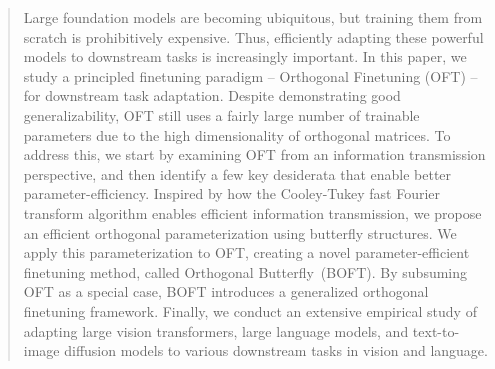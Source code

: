 \begin{abstract}
Large foundation models are becoming ubiquitous, but training them from scratch is prohibitively expensive. Thus, efficiently adapting these powerful models to downstream tasks is increasingly important. In this paper, we study a principled finetuning paradigm -- Orthogonal Finetuning (OFT) -- for downstream task adaptation. Despite demonstrating good generalizability, OFT still uses a fairly large number of trainable parameters due to the high dimensionality of orthogonal matrices. To address this, we start by examining OFT from an information transmission perspective, and then identify a few key desiderata that enable better parameter-efficiency. Inspired by how the Cooley-Tukey fast Fourier transform algorithm enables efficient information transmission, we propose an efficient orthogonal parameterization using  butterfly structures. We apply this parameterization to OFT, creating  a novel parameter-efficient finetuning method, called Orthogonal Butterfly~(BOFT). By subsuming OFT as a special case, BOFT introduces a generalized orthogonal finetuning framework. Finally, we conduct an extensive empirical study of adapting large vision transformers, large language models, and text-to-image diffusion models to various downstream tasks in vision and language.
\end{abstract}

